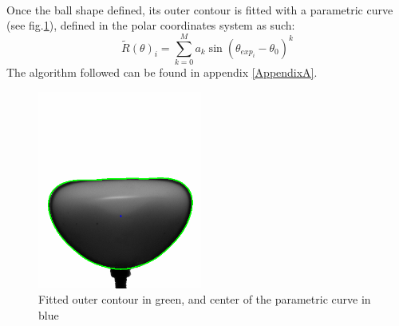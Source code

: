 
\paragraph{}
Once the ball shape defined, its outer contour is fitted with a parametric curve (see fig.\ref{fig:outer_contour}), defined in the polar coordinates system as such: 
\begin{equation*}
	\tilde{R}(\theta)_i =\sum\limits_{k=0}^M a_k \sin(\theta_{exp_i}-\theta_0)^k
	\label{eq:parametric_curve}
\end{equation*}
The algorithm followed can be found in appendix \ref{AppendixA}.
\begin{figure}[H] %
	\centering%
  \includegraphics[width=0.48\textwidth]{figures/Chapter_1/outer_contour.png}
	\caption{Fitted outer contour in green, and center of the parametric curve in blue}
	\label{fig:outer_contour}
\end{figure}

